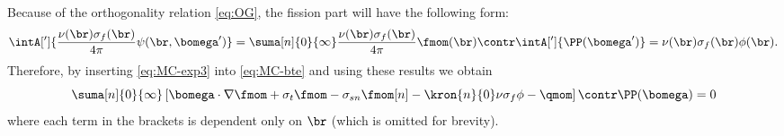 Because of the orthogonality relation \eqref{eq:OG}, the fission part will have the following form:
\begin{equation}%
  \intA[']{\frac{\nu(\br)\sigma_f(\br)}{4\pi}\psi(\br,\bomega')} = 
    \suma[n]{0}{\infty}
    \frac{\nu(\br)\sigma_f(\br)}{4\pi}\fmom(\br)\contr\intA[']{\PP(\bomega')} = \nu(\br)\sigma_f(\br)\phi(\br).
\end{equation}
Therefore, by inserting \eqref{eq:MC-exp3} into \eqref{eq:MC-bte} and using these results we obtain
\begin{equation}\label{eq:MC-bte2}
  \suma[n]{0}{\infty}\left[\bomega\cdot\nabla\fmom + \sigma_t\fmom 
  - \sigma_{sn}\fmom[n] - \kron{n}{0}\nu\sigma_f\phi - \qmom\right]\contr\PP(\bomega) = 0
\end{equation}
where each term in the brackets is dependent only on $\br$ (which is omitted for brevity).

